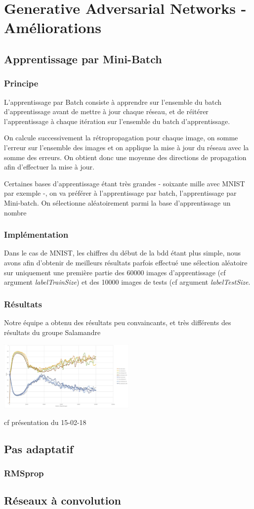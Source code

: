 \chapter{Generative Adversarial Networks - Améliorations}


\section{Apprentissage par Mini-Batch}
\subsection{Principe}
L'apprentissage par Batch consiste à apprendre sur l'ensemble du batch d'apprentissage avant de mettre à jour chaque réseau, et de réitérer l'apprentissage à chaque itération sur l'ensemble du batch d'apprentissage.

On calcule successivement la rétropropagation pour chaque image, on somme l'erreur sur l'ensemble des images et on applique la mise à jour du réseau avec la somme des erreurs. On obtient donc une moyenne des directions de propagation afin d'effectuer la mise à jour.

Certaines bases d'apprentissage étant très grandes - soixante mille avec MNIST par exemple -, on va préférer à l'apprentissage par batch, l'apprentissage par Mini-batch. 
On sélectionne aléatoirement parmi la base d'apprentissage un nombre 
\subsection{Implémentation}
Dans le cas de MNIST, les chiffres du début de la bdd étant plus simple, nous avons afin d'obtenir de meilleurs résultats parfois effectué une sélection aléatoire sur uniquement une première partie des 60000 images d'apprentissage (cf argument \textit{labelTrainSize}) et des 10000 images de tests (cf argument \textit{labelTestSize}.
\subsection{Résultats}
Notre équipe a obtenu des résultats peu convaincants, et très différents des résultats du groupe Salamandre 


\includegraphics[width=0.5\textwidth]{images/08-gan_ameliorations_resultats_1.jpg}


cf présentation du 15-02-18


\section{Pas adaptatif}
\subsection{RMSprop}

\section{Réseaux à convolution}



